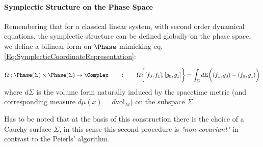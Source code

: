 \documentclass[Main]{subfiles}
\begin{document}
		\paragraph{Symplectic Structure on the Phase Space}
			Remembering that for a classical linear system, with second order dynamical equations, the symplectic structure can be defined globally on the phase space, we define a bilinear form on $\Phase$ mimicking eq. \ref{Eq:SymplecticCoordinateRepresentation}:
			\begin{definition}\label{Def:InitialDataSymplecticForm}
				\begin{displaymath}
					\Omega: \Phase(\Sigma) \times \Phase(\Sigma) \rightarrow \Complex \qquad : \qquad
					\Omega \biggr\{ [f_0,f_1] , [g_0, g_1] \biggr\} = \int_\Sigma d\Sigma \biggr( (f_1,g_0)  - ( f_0, g_1) \biggr)
				\end{displaymath}
				where $d\Sigma$ is the volume form naturally induced by the spacetime metric (and corresponding measure $d\mu(x)= d\textrm{vol}_M$) on the subspace $\Sigma$.
			\end{definition}

			Has to be noted that at the basis of this construction there is the choice of a Cauchy surface $\Sigma$, in this sense this second procedure is \emph{"non-covariant"} in contrast to the Peierls' algorithm.
\end{document}

